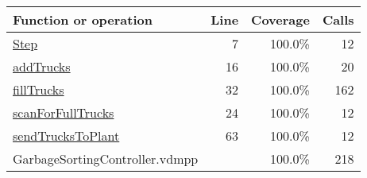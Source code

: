 \bigskip
\begin{longtable}{|l|r|r|r|}
\hline
Function or operation & Line & Coverage & Calls \\
\hline
\hline
\hyperref[Step:7]{Step} & 7&100.0\% & 12 \\
\hline
\hyperref[addTrucks:16]{addTrucks} & 16&100.0\% & 20 \\
\hline
\hyperref[fillTrucks:32]{fillTrucks} & 32&100.0\% & 162 \\
\hline
\hyperref[scanForFullTrucks:24]{scanForFullTrucks} & 24&100.0\% & 12 \\
\hline
\hyperref[sendTrucksToPlant:63]{sendTrucksToPlant} & 63&100.0\% & 12 \\
\hline
\hline
GarbageSortingController.vdmpp & & 100.0\% & 218 \\
\hline
\end{longtable}

